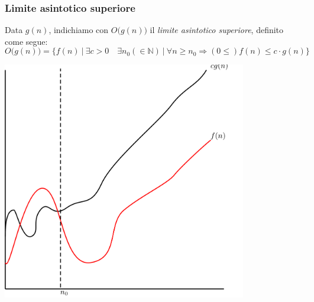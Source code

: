 \subsubsection{Limite asintotico superiore}
Data $g(n)$, indichiamo con $O \big(g(n) \big)$ il \emph{limite asintotico superiore}, definito come segue:
\begin{displaymath}
	O \big(g(n) \big) = \{ f(n) \ \vert \ \exists c > 0 \quad \exists n_0 (\in \mathbb{N}) \ \vert \ \forall n \geq n_0 \Rightarrow (0 \leq) f(n) \leq c \cdot g(n) \}
\end{displaymath}

\begin{center}
	\includegraphics[width=0.80\textwidth]{img/plots/plotO.png}
\end{center}


